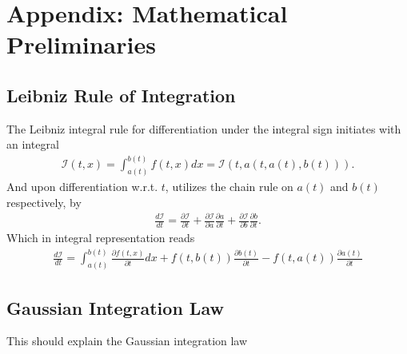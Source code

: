 \appendix
\section{Appendix: Mathematical Preliminaries}
\subsection{Leibniz Rule of Integration}
\label{appendix:leibniz}
The Leibniz integral rule for differentiation under the integral sign
initiates with an integral
\begin{align}
    \mathcal{I}(t, x) = \int_{a(t)}^{b(t)} f(t, x) dx = \mathcal{I}(t, a(t,
    a(t), b(t))).
\end{align}
And upon differentiation w.r.t. $t$, utilizes the chain rule on $a(t)$ and
$b(t)$ respectively, by
\begin{align}
    \frac{d\mathcal{I}}{dt} =
    \frac{\partial \mathcal{I}}{\partial t}+
    \frac{\partial \mathcal{I}}{\partial a}\frac{\partial a}{\partial t}+
    \frac{\partial \mathcal{I}}{\partial b}\frac{\partial b}{\partial t}.
\end{align}
Which in integral representation reads
\begin{align}
    \frac{d\mathcal{I}}{dt} = \int_{a(t)}^{b(t)}\frac{\partial f(t,
    x)}{\partial t} dx + f(t, b(t)) \frac{\partial b(t)}{\partial t}
    - f(t, a(t)) \frac{\partial a(t)}{\partial t}
\end{align}

\subsection{Gaussian Integration Law}
\label{appendix:gauss integration}
This should explain the Gaussian integration law


